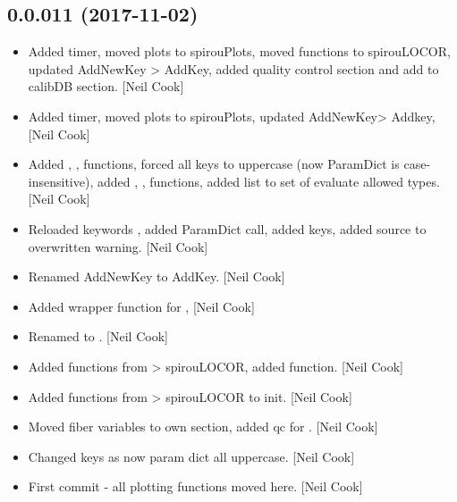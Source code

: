 \documentclass[a4paper,10pt,english]{report}
\begin{document}
\subsection{0.0.011 (2017-11-02)}
\label{\detokenize{misc/changelog:id539}}\begin{itemize}
\item {} 
Added timer, moved plots to spirouPlots, moved functions to
spirouLOCOR, updated AddNewKey \textendash{}\textgreater{} AddKey, added quality control
section and add to calibDB section. {[}Neil Cook{]}

\item {} 
Added timer, moved plots to spirouPlots, updated AddNewKey\textendash{}\textgreater{} Addkey,
{[}Neil Cook{]}

\item {} 
Added , ,  functions, forced all keys
to uppercase (now ParamDict is case-insensitive), added ,
,  functions, added list to set
of evaluate allowed types. {[}Neil Cook{]}

\item {} 
Reloaded keywords , added ParamDict call, added  keys,
added source to overwritten warning. {[}Neil Cook{]}

\item {} 
Renamed AddNewKey to AddKey. {[}Neil Cook{]}

\item {} 
Added wrapper function for  , {[}Neil Cook{]}

\item {} 
Renamed  to
. {[}Neil Cook{]}

\item {} 
Added functions from  \textendash{}\textgreater{} spirouLOCOR, added
 function. {[}Neil Cook{]}

\item {} 
Added functions from  \textendash{}\textgreater{} spirouLOCOR to init. {[}Neil Cook{]}

\item {} 
Moved fiber variables to own section, added qc for . {[}Neil
Cook{]}

\item {} 
Changed keys as now param dict all uppercase. {[}Neil Cook{]}

\item {} 
First commit - all plotting functions moved here. {[}Neil Cook{]}

\end{itemize}
\end{document}
